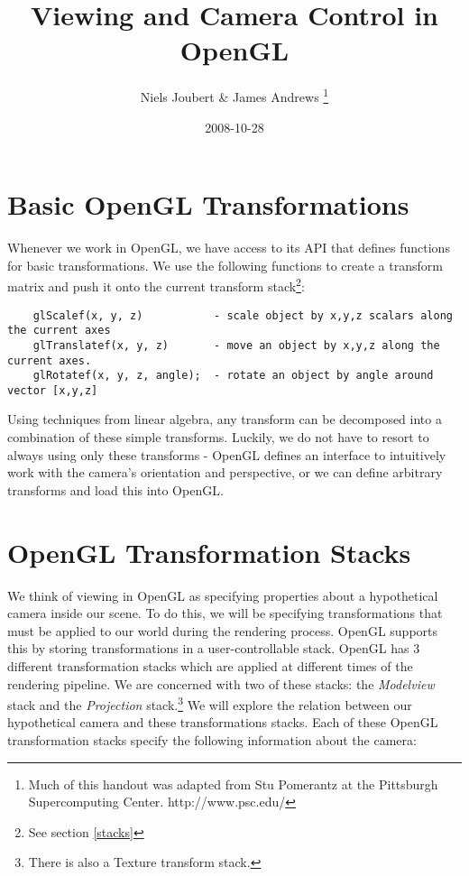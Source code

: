 \documentclass[]{article}
\title{Viewing and Camera Control in OpenGL}
\author{ Niels Joubert \& James Andrews \footnote{Much of this handout was adapted from Stu Pomerantz at the Pittsburgh Supercomputing Center. http://www.psc.edu/} }
\date{2008-10-28}
\begin{document}
\ifpdf
{}
\else
{}
\fi

\maketitle

\section{Basic OpenGL Transformations}

Whenever we work in OpenGL, we have access to its API that defines functions for basic transformations. We use the following functions to create a transform matrix and push it onto the current transform stack\footnote{See section \ref{stacks}}:

\begin{verbatim}
    glScalef(x, y, z)           - scale object by x,y,z scalars along the current axes
    glTranslatef(x, y, z)       - move an object by x,y,z along the current axes.
    glRotatef(x, y, z, angle);  - rotate an object by angle around vector [x,y,z]
\end{verbatim}

Using techniques from linear algebra, any transform can be decomposed into a combination of these simple transforms. Luckily, we do not have to resort to always using only these transforms - OpenGL defines an interface to intuitively work with the camera's orientation and perspective, or we can define arbitrary transforms and load this into OpenGL.

\section{OpenGL Transformation Stacks \label{stacks}}

We think of viewing in OpenGL as specifying properties about a hypothetical camera inside our scene. To do this, we will be specifying transformations that must be applied to our world during the rendering process. OpenGL supports this by storing transformations in a user-controllable stack. OpenGL has 3 different transformation stacks which are applied at different times of the rendering pipeline. We are concerned with two of these stacks: the \emph{Modelview} stack and the \emph{Projection} stack.\footnote{There is also a Texture transform stack.} We will explore the relation between our hypothetical camera and these transformations stacks. Each of these OpenGL transformation stacks specify the following information about the camera:
\end{document}
